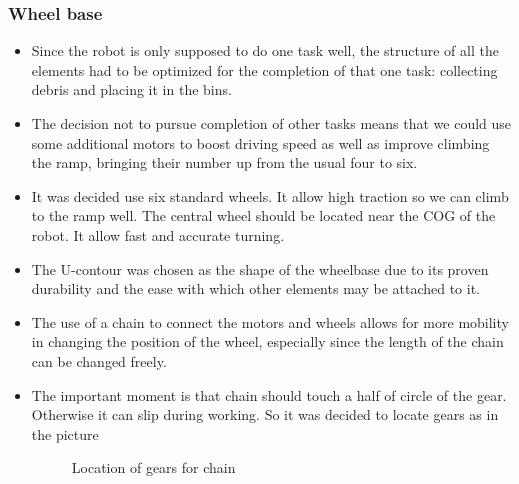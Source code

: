 \subsubsection{Wheel base}
\begin{itemize}
\item Since the robot is only supposed to do one task well, the structure of all the elements had to be optimized for the completion of that one task: collecting debris and placing it in the bins.

\item The decision not to pursue completion of other tasks means that we could use some additional motors to boost driving speed as well as improve climbing the ramp, bringing their number up from the usual four to six.

\item It was decided use six standard wheels. It allow high traction so we can climb to the ramp well. The central wheel should be located near the COG of the robot. It allow fast and accurate turning. 

\item The U-contour was chosen as the shape of the wheelbase due to its proven durability and the ease with which other elements may be attached to it.

\item The use of a chain to connect the motors and wheels allows for more mobility in changing the position of the wheel, especially since the length of the chain can be changed freely.

\item The important moment is that chain should touch a half of circle of the gear. Otherwise it can slip during working. So it was decided to locate gears as in the picture
\begin{figure}[H]
	\begin{minipage}[h]{1\linewidth}
		\caption{Location of gears for chain}
	\end{minipage}
\end{figure} 




\end{itemize}
